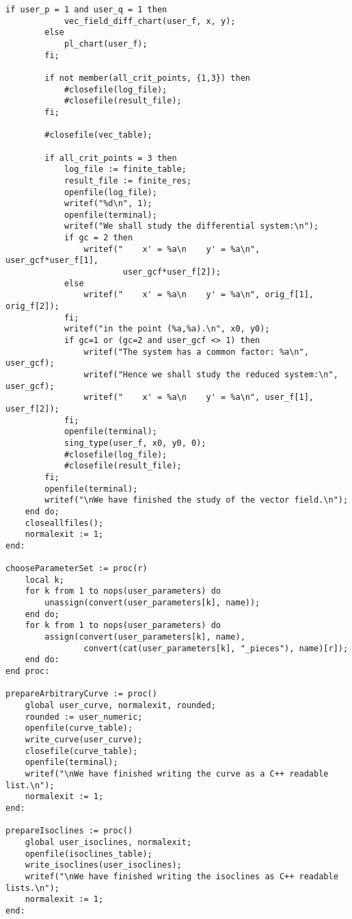 \documentclass[a4paper,10pt]{article}
\begin{document}
\begin{lstlisting}[name=main]
        if user_p = 1 and user_q = 1 then
            vec_field_diff_chart(user_f, x, y);
        else
            pl_chart(user_f);
        fi;

        if not member(all_crit_points, {1,3}) then
            #closefile(log_file);
            #closefile(result_file);
        fi;

        #closefile(vec_table);

        if all_crit_points = 3 then
            log_file := finite_table;
            result_file := finite_res;
            openfile(log_file);
            writef("%d\n", 1);
            openfile(terminal);
            writef("We shall study the differential system:\n");
            if gc = 2 then
                writef("    x' = %a\n    y' = %a\n", user_gcf*user_f[1],
                        user_gcf*user_f[2]);
            else
                writef("    x' = %a\n    y' = %a\n", orig_f[1], orig_f[2]);
            fi;
            writef("in the point (%a,%a).\n", x0, y0);
            if gc=1 or (gc=2 and user_gcf <> 1) then
                writef("The system has a common factor: %a\n", user_gcf);
                writef("Hence we shall study the reduced system:\n", user_gcf);
                writef("    x' = %a\n    y' = %a\n", user_f[1], user_f[2]);
            fi;
            openfile(terminal);
            sing_type(user_f, x0, y0, 0);
            #closefile(log_file);
            #closefile(result_file);
        fi;
        openfile(terminal);
        writef("\nWe have finished the study of the vector field.\n");
    end do;
    closeallfiles();
    normalexit := 1;
end:

chooseParameterSet := proc(r)
    local k;
    for k from 1 to nops(user_parameters) do
        unassign(convert(user_parameters[k], name));
    end do;
    for k from 1 to nops(user_parameters) do
        assign(convert(user_parameters[k], name),
                convert(cat(user_parameters[k], "_pieces"), name)[r]);
    end do:
end proc:

prepareArbitraryCurve := proc()
    global user_curve, normalexit, rounded;
    rounded := user_numeric;
    openfile(curve_table);
    write_curve(user_curve);
    closefile(curve_table);
    openfile(terminal);
    writef("\nWe have finished writing the curve as a C++ readable list.\n");    
    normalexit := 1;
end:

prepareIsoclines := proc()
    global user_isoclines, normalexit;
    openfile(isoclines_table);
    write_isoclines(user_isoclines);
    writef("\nWe have finished writing the isoclines as C++ readable lists.\n");
    normalexit := 1;
end:


\end{lstlisting}
\end{document}
